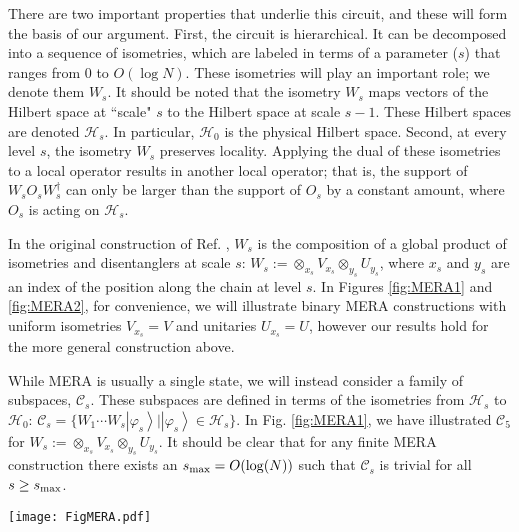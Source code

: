 \documentclass[a4paper,11pt]{article}
\newcommand{\ket}[1]{\left|#1\right\rangle}
\newcommand{\1}{\mathbbm{1}}
\newcommand{\cH}{\mathcal{H}}
\newcommand{\cC}{\mathcal{C}}
\begin{document}
There are two important properties that underlie this circuit, and these will form the basis of our argument. First, the circuit is hierarchical. It can be decomposed
into a sequence of isometries, which are labeled in terms of a parameter ($s$) that ranges from $0$ to $O(\log N)$. These isometries will play an important role; we
denote them  $W_s$. It should be noted that the isometry $W_s$ maps vectors of the Hilbert space at ``scale" $s$ to
the Hilbert space at scale $s-1$. These Hilbert spaces are denoted  $\mathcal{H}_s$. In particular, $\mathcal{H}_0$ is the physical Hilbert space. Second, at every level $s$, the isometry $W_s$ preserves locality.  Applying the dual of these isometries to a local operator results in another local operator; that is,
the support of $W_s O_s W_s^{\dagger}$ can only be larger than the support of $O_s$ by a constant amount, where $O_s$ is acting on $\cH_s$.

In the original construction of Ref. \cite{Vidal2007}, $W_s$ is the composition of a global product of isometries and disentanglers at scale $s$: $W_s:= \otimes_{x_s} V_{x_s}\otimes_{y_s}U_{y_s}$, where $x_s$ and $y_s$ are an index of the position along the chain at level $s$. In Figures \ref{fig:MERA1} and \ref{fig:MERA2}, for convenience, we will illustrate binary MERA constructions with uniform isometries $V_{x_s}=V$ and unitaries $U_{x_s}=U$,  however our results hold for the more general construction above.

While MERA is usually a single state, we will instead consider a family of subspaces, $\cC_s$. These subspaces are defined in terms of the isometries from $\mathcal{H}_s$ to $\mathcal{H}_0$: $\cC_s=\{ W_1 \cdots W_s\ket{\varphi_s} | \ket{\varphi_s}\in\cH_s\}$.
In Fig. \ref{fig:MERA1}, we have illustrated $\cC_5$ for $W_s:= \otimes_{x_s} V_{x_s}\otimes_{y_s}U_{y_s}$. It should be clear that for any finite MERA construction there exists an $s_{\rm max}=O(\log(N))$ such that $\cC_s$ is trivial for all $s\geq {s_{\rm max}}$.

\begin{figure*}
	\begin{center}
		\texttt{[image: FigMERA.pdf]}
	\caption{
       We illustrate a scale invariant MERA construction. The blue rectangles are the disentangling unitaries $\{U_{x_s}\}$, and the red triangles are the isometries $\{V_{x_s}\}$. The green blocks represent local observables. a) A MERA network up to level $s=5$ with the isometries $W_s:= \otimes_{x_s} V_{x_s}\otimes_{y_s}U_{y_s}$. The yellow box at the top of the figure represents the Hilbert space $\cH_5$ and can be considered as the bare logical vectors. The MERA circuit serves as an encoding map from the logical space $\cH_s$ onto the physical one $\cC_s$. b) The past causal cone of a local observable in the physical space (the boundary). Locality (3-adjacent) of the observable is preserved at all levels of the network. c) The transfer operator $\Phi(\cdot)$ acting on an elementary block.
		}\label{fig:MERA1}
			\end{center}
\end{figure*}
\end{document}
